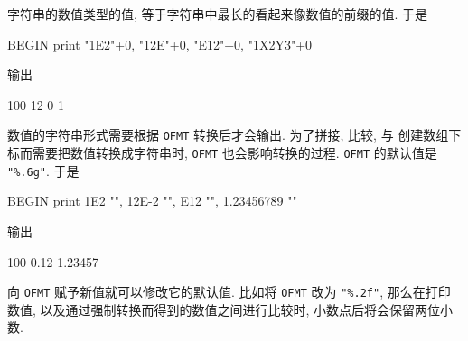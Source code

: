 字符串的数值类型的值, 等于字符串中最长的看起来像数值的前缀的值. 于是
\begin{awkcode}
    BEGIN { print "1E2"+0, "12E"+0, "E12"+0, "1X2Y3"+0 }
\end{awkcode}
输出
\begin{file}
    100 12 0 1
\end{file}

数值的字符串形式需要根据 \verb'OFMT' 转换后才会输出. 为了拼接, 比较, 与
创建数组下标而需要把数值转换成字符串时, \verb'OFMT' 也会影响转换的过程.
\verb'OFMT' 的默认值是 \verb'"%.6g"'. 于是
\begin{awkcode}
    BEGIN { print 1E2 "", 12E-2 "", E12 "", 1.23456789 "" }
\end{awkcode}
输出
\begin{file}
    100 0.12  1.23457
\end{file}
向 \verb'OFMT' 赋予新值就可以修改它的默认值. 比如将 \verb'OFMT' 改为
\verb'"%.2f"', 那么在打印数值, 以及通过强制转换而得到的数值之间进行比较时, 
小数点后将会保留两位小数.

